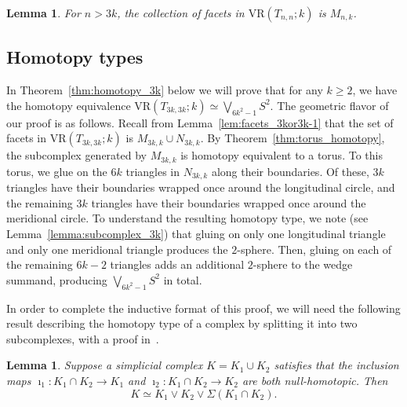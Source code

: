 \documentclass[12pt,a4paper]{amsart}
\newtheorem{lemma}[theorem]{Lemma}
\theoremstyle{definition}
\newcommand{\vr}[2]{\mathrm{VR}(#1;#2)}
\newcommand{\note}[1]{\textcolor{blue}{({#1})}}
\numberwithin{equation}{section}
\begin{document}



\begin{lemma}
\label{lem:facets_n>3k}
For $n> 3k$, the collection of facets in $\vr{T_{n, n}}{k}$ is $M_{n, k}$.
\end{lemma}


\subsection{Homotopy types}
\label{ssec:homotopy}

In Theorem~\ref{thm:homotopy_3k} below we will prove that for any $k\geq 2$, we have the homotopy equivalence $\vr{T_{3k,3k}}{k}\simeq \bigvee_{6k^2-1} S^2$.
The geometric flavor of our proof is as follows.
Recall from Lemma~\ref{lem:facets_3kor3k-1} that the set of facets in $\vr{T_{3k,3k}}{k}$ is $M_{3k,k}\cup N_{3k,k}$.
By Theorem~\ref{thm:torus_homotopy}, the subcomplex generated by $M_{3k,k}$ is homotopy equivalent to a torus.
To this torus, we glue on the $6k$ triangles in $N_{3k,k}$ along their boundaries.
Of these, $3k$ triangles have their boundaries wrapped once around the longitudinal circle, and the remaining $3k$ triangles have their boundaries wrapped once around the meridional circle.
To understand the resulting homotopy type, we note (see Lemma~\ref{lemma:subcomplex_3k}) that gluing on only one longitudinal triangle and only one meridional triangle produces the $2$-sphere.
Then, gluing on each of the remaining $6k-2$ triangles adds an additional $2$-sphere to the wedge summand, producing $\bigvee_{6k^2-1} S^2$ in total.

In order to complete the inductive format of this proof, we will need the following result describing the homotopy type of a complex by splitting it into two subcomplexes, with a proof in~\cite{GSS22}.

\begin{lemma}
\label{cup_simp}
Suppose a simplicial complex $K=K_1\cup K_2$ satisfies that the inclusion maps $\imath_1: K_1\cap K_2\rightarrow K_1$ and $\imath_2: K_1\cap K_2\rightarrow K_2$ are both null-homotopic.
Then 
\[K\simeq K_1\vee K_2\vee\Sigma(K_1\cap K_2).\]
\end{lemma}
\end{document}
